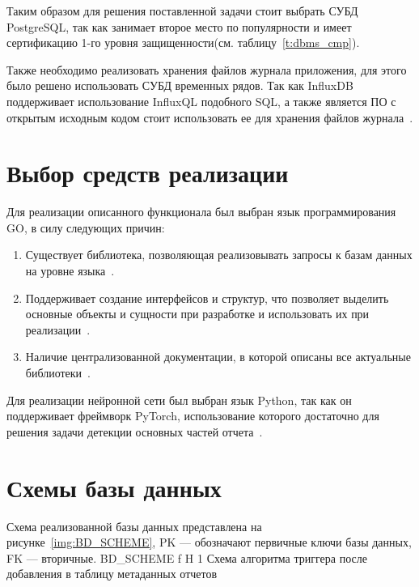 Таким образом для решения поставленной задачи стоит выбрать СУБД PostgreSQL, так
как занимает второе место по популярности  и имеет сертификацию 1-го уровня
защищенности(см. таблицу~\ref{t:dbms_cmp}).

Также необходимо реализовать хранения файлов журнала приложения, для этого было
решено использовать СУБД временных рядов. Так как InfluxDB поддерживает
использование InfluxQL подобного SQL, а также является ПО с открытым исходным
кодом стоит использовать ее для хранения файлов журнала~\cite{time_db}.

\section{Выбор средств реализации}
Для реализации описанного функционала был выбран язык программирования GO, в
силу следующих причин:
\begin{enumerate}
	\item Существует библиотека, позволяющая реализовывать
	запросы к базам данных на уровне языка~\cite{gorm}.
	\item Поддерживает создание интерфейсов и структур, что позволяет выделить
	основные объекты и сущности при разработке и использовать их при
	реализации~\cite{go_interface}.
	\item Наличие централизованной документации, в которой описаны все актуальные библиотеки~\cite{go_package}.
\end{enumerate}

Для реализации нейронной сети был выбран язык Python, так как он поддерживает
фреймворк PyTorch, использование которого достаточно для решения задачи детекции
основных частей отчета~\cite{pytorch}.

\section{Схемы базы данных}
Схема реализованной базы данных представлена на рисунке~\ref{img:BD_SCHEME}, PK
--- обозначают первичные ключи базы данных, FK --- вторичные.
{BD_SCHEME} %
{f} %
{H} %
{1\textwidth} %
{Схема алгоритма триггера после добавления в таблицу метаданных отчетов} %

